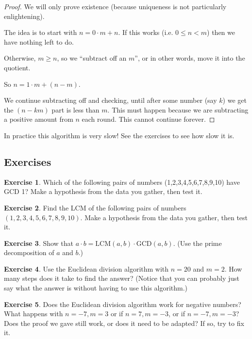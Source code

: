 \documentclass[11pt]{article}
\theoremstyle{definition}
\newtheorem{exercise}{Exercise}
\numberwithin{thm}{section}
\begin{document}
\begin{proof} We will only prove existence (because uniqueness is not particularly enlightening).

The idea is to start with $n = 0 \cdot m + n$. If this works (i.e. $0 \leq n < m$) then we have nothing left to do.

Otherwise, $m \geq n$, so we ``subtract off an $m$'', or in other words, move it into the quotient.

So $n = 1 \cdot m + (n-m)$.

We continue subtracting off and checking, until after some number (say $k$) we get the $(n-km)$ part is less than $m$. This must happen because we are subtracting a positive amount from $n$ each round. This cannot continue forever.
\end{proof}

In practice this algorithm is very slow! See the exercises to see how slow it is.

\subsection{Exercises}

\begin{exercise} Which of the following pairs of numbers (1,2,3,4,5,6,7,8,9,10) have GCD 1? Make a hypothesis from the data you gather, then test it.
\end{exercise}

\begin{exercise} Find the LCM of the following pairs of numbers $(1,2,3,4,5,6,7,8,9,10)$. Make a hypothesis from the data you gather, then test it.
\end{exercise}

\begin{exercise} Show that $a\cdot b = \text{LCM}(a,b)\cdot\text{GCD}(a,b)$. (Use the prime decomposition of $a$ and $b$.)
\end{exercise}

\begin{exercise} Use the Euclidean division algorithm with $n = 20$ and $m = 2$. How many steps does it take to find the answer? (Notice that you can probably just say what the answer is without having to use this algorithm.)
\end{exercise}

\begin{exercise} Does the Euclidean division algorithm work for negative numbers? What happens with $n = -7, m = 3$ or if $n = 7, m = -3$, or if $n = -7, m=-3$? Does the proof we gave still work, or does it need to be adapted? If so, try to fix it.
\end{exercise}
\end{document}
